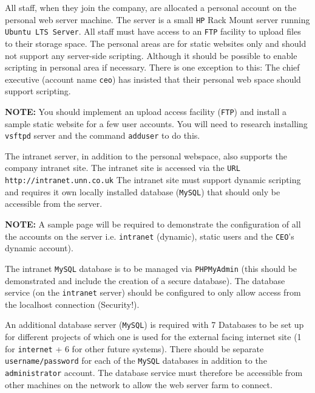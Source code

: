 \documentclass[11pt]{article}
\begin{document}
\noindent All staff, when they join the company, are allocated a personal account on the personal web server machine. The server is a small \texttt{HP} 
Rack Mount server running \texttt{Ubuntu LTS Server}. All staff must have access to an \texttt{FTP} facility to upload files to their storage space. 
The personal areas are for static websites only and should not support any server-side scripting. Although it should be possible to enable scripting 
in personal area if necessary. There is one exception to this: The chief executive (account name \texttt{ceo}) has insisted that their personal web 
space should support scripting.\\ 

\begin{tcolorbox}[colback=blue!20]
    \textbf{NOTE:} You should implement an upload access facility (\texttt{FTP}) and install a sample static website for a few user accounts. You will need to research 
    installing \texttt{vsftpd} server and the command \texttt{adduser} to do this.
\end{tcolorbox}

\noindent The intranet server, in addition to the personal webspace, also supports the company intranet site. The intranet site is accessed via the \texttt{URL} 
\texttt{http://intranet.unn.co.uk} The intranet site must support dynamic scripting and requires it own locally installed database (\texttt{MySQL}) that should 
only be accessible from the server.\\ 

\begin{tcolorbox}[colback=blue!20]
    \textbf{NOTE:} A sample page will be required to demonstrate the configuration of all the accounts on the server i.e. \texttt{intranet} (dynamic), 
    static users and the \texttt{CEO}’s dynamic account). 
\end{tcolorbox}

\noindent The intranet \texttt{MySQL} database is to be managed via \texttt{PHPMyAdmin} (this should be demonstrated and include the creation of a 
secure database). The database service (on the \texttt{intranet} server) should be configured to only allow access from the localhost connection (Security!).

\noindent An additional database server (\texttt{MySQL}) is required with 7 Databases to be set up for different projects of which one is used for the external facing 
internet site (1 for \texttt{internet} + 6 for other future systems). There should be separate \texttt{username/password} for each of the \texttt{MySQL} 
databases in addition to the \texttt{administrator} account. The database service must therefore be accessible from other machines on the network to allow 
the web server farm to connect.\\
\end{document}
